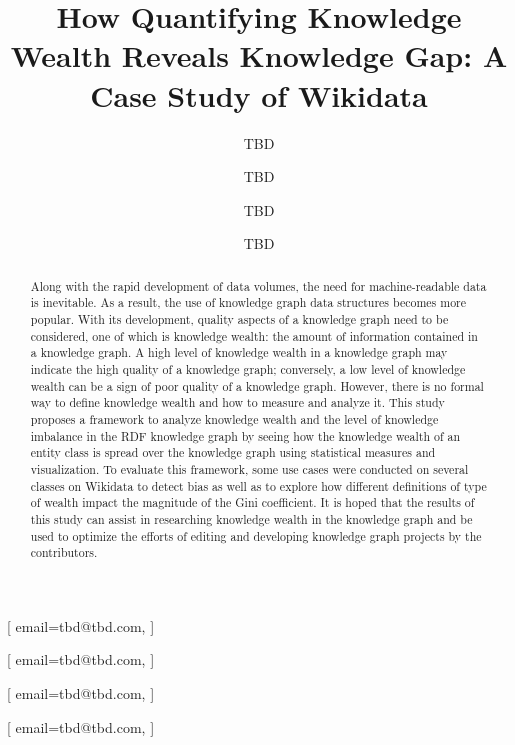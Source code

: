 \documentclass[
]{ceurart}
\begin{document}


\title{How Quantifying Knowledge Wealth Reveals Knowledge Gap: A Case Study of Wikidata}


\author[1]{TBD}[%
email=tbd@tbd.com,
]
\author[1]{TBD}[%
email=tbd@tbd.com,
]
\address[1]{TBD}

\author[2]{TBD}[%
email=tbd@tbd.com,
]
\address[2]{TBD}

\author[3]{TBD}[%
email=tbd@tbd.com,
]
\address[3]{TBD}


\begin{abstract}
Along with the rapid development of data volumes, the need for machine-readable data is inevitable. As a result, the use of knowledge graph data structures becomes more popular. With its development, quality aspects of a knowledge graph need to be considered, one of which is knowledge wealth: the amount of information contained in a knowledge graph. A high level of knowledge wealth in a knowledge graph may indicate the high quality of a knowledge graph; conversely, a low level of knowledge wealth can be a sign of poor quality of a knowledge graph. However, there is no formal way to define knowledge wealth and how to measure and analyze it. This study proposes a framework to analyze knowledge wealth and the level of knowledge imbalance in the RDF knowledge graph by seeing how the knowledge wealth of an entity class is spread over the knowledge graph using statistical measures and visualization. To evaluate this framework, some use cases were conducted on several classes on Wikidata to detect bias as well as to explore how different definitions of type of wealth impact the magnitude of the Gini coefficient. It is hoped that the results of this study can assist in researching knowledge wealth in the knowledge graph and be used to optimize the efforts of editing and developing knowledge graph projects by the contributors.
\end{abstract}
\end{document}
